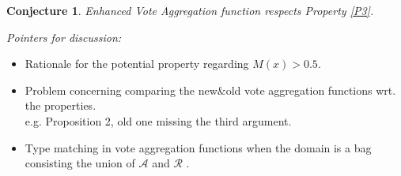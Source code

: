 \documentclass{article}
\newtheorem{conjecture}{Conjecture}
\newcommand{\args}{\mathcal{A}} %
\newcommand{\att}{\mathcal{R}}  %
\begin{document}
\begin{conjecture}
Enhanced Vote Aggregation function respects Property \ref{P3}.
\end{conjecture}




{\color{teal}
 
\emph{Pointers for discussion:} 
\begin{itemize}
\item Rationale for the potential property regarding $M(x) > 0.5$.
\item Problem concerning comparing the new\&old vote aggregation functions wrt. the properties. \\ e.g. Proposition 2, old one missing the third argument.
\item Type matching in vote aggregation functions when the domain is a bag consisting the union of $\args$ and $\att$ .
\end{itemize}
}
\end{document}

